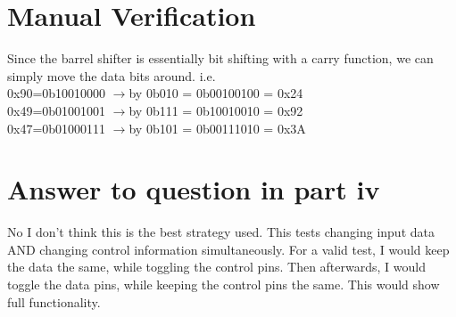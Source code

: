 \documentclass[11pt]{report}
\begin{document}
\section*{Manual Verification}
Since the barrel shifter is essentially bit shifting with a carry function, we can simply move the data bits around. i.e.\\

0x90=0b10010000 $\rightarrow $by 0b010 = 0b00100100 = 0x24\\
0x49=0b01001001 $\rightarrow $by 0b111 = 0b10010010 = 0x92\\
0x47=0b01000111 $\rightarrow $by 0b101 = 0b00111010 = 0x3A\\
\section*{Answer to question in part iv}
No I don't think this is the best strategy used. This tests changing input data AND changing control information simultaneously. For a valid test, I would keep the data the same, while toggling the control pins. Then afterwards, I would toggle the data pins, while keeping the control pins the same. This would show full functionality.
\end{document}
